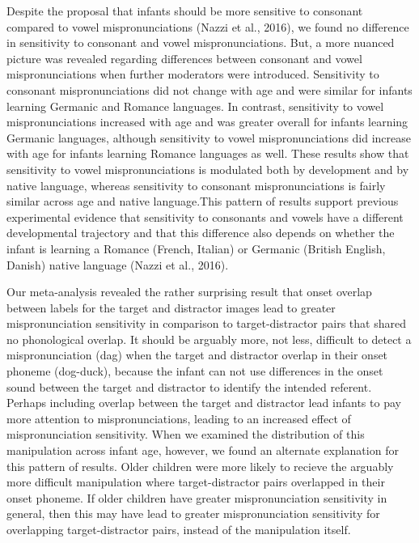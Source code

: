 \documentclass[man]{apa6}
\begin{document}
Despite the proposal that infants should be more sensitive to consonant compared to vowel mispronunciations (Nazzi et al., 2016), we found no difference in sensitivity to consonant and vowel mispronunciations. But, a more nuanced picture was revealed regarding differences between consonant and vowel mispronunciations when further moderators were introduced. Sensitivity to consonant mispronunciations did not change with age and were similar for infants learning Germanic and Romance languages. In contrast, sensitivity to vowel mispronunciations increased with age and was greater overall for infants learning Germanic languages, although sensitivity to vowel mispronunciations did increase with age for infants learning Romance languages as well. These results show that sensitivity to vowel mispronunciations is modulated both by development and by native language, whereas sensitivity to consonant mispronunciations is fairly similar across age and native language.This pattern of results support previous experimental evidence that sensitivity to
consonants and vowels have a different developmental trajectory and that this difference also depends on whether the infant is learning a Romance (French, Italian) or Germanic (British English, Danish) native language (Nazzi et al., 2016).

Our meta-analysis revealed the rather surprising result that onset overlap between labels for the target and distractor images lead to greater mispronunciation sensitivity in comparison to target-distractor pairs that shared no phonological overlap. It should be arguably more, not less, difficult to detect a mispronunciation (dag) when the target and distractor overlap in their onset phoneme (dog-duck), because the infant can not use differences in the onset sound between the target and distractor to identify the intended referent. Perhaps including overlap between the target and distractor lead infants to pay more attention to mispronunciations, leading to an increased effect of mispronunciation sensitivity. When we examined the distribution of this manipulation across infant age, however, we found an alternate explanation for this pattern of results. Older children were more likely to recieve the arguably more difficult manipulation where target-distractor pairs overlapped in their onset phoneme. If older children have greater mispronunciation sensitivity in general, then this may have lead to greater mispronunciation sensitivity for overlapping target-distractor pairs, instead of the manipulation itself.
\end{document}
